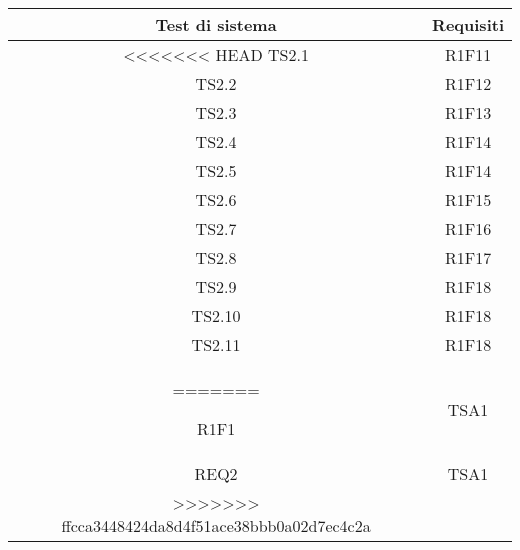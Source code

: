 \begin{center}
	\begin{longtable}{|c|c|}
	\hline
	\rowcolor{lighter-grayer}
	\textbf{Test di sistema} & \textbf{Requisiti} \\
	\hline
	\endfirsthead


	
<<<<<<< HEAD
	\hline
	TS2.1 & R1F11  \\
	TS2.2 & R1F12 \\
	TS2.3 & R1F13 \\
	TS2.4 & R1F14 \\
	TS2.5 & R1F14 \\
	TS2.6 & R1F15 \\
	TS2.7 & R1F16 \\
	TS2.8 & R1F17 \\
	TS2.9 & R1F18 \\
	TS2.10 & R1F18 \\
	TS2.11 & R1F18 \\
=======
	
	R1F1 & TSA1  \\
	REQ2 & TSA1 \\

>>>>>>> ffcca3448424da8d4f51ace38bbb0a02d7ec4c2a
	\hline

	\end{longtable}
\end{center}


